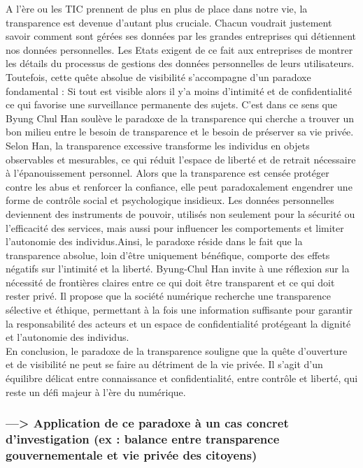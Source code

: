 \documentclass[11pt,a4paper]{article}
\begin{document}
A l’ère ou les TIC prennent de plus en plus de place dans notre vie, la transparence est devenue d’autant plus cruciale. Chacun voudrait justement savoir comment sont gérées ses données par les grandes entreprises qui détiennent nos données personnelles. Les Etats exigent de ce fait aux entreprises de montrer les détails du processus de gestions des données personnelles de leurs utilisateurs. Toutefois, cette quête absolue de visibilité s’accompagne d’un paradoxe fondamental : Si tout est visible alors il y’a moins d’intimité et de confidentialité ce qui favorise une surveillance permanente des sujets. C’est dans ce sens que Byung Chul Han soulève le paradoxe de la transparence qui cherche a trouver un bon milieu entre le besoin de transparence et le besoin de préserver sa vie privée. \\
Selon Han, la transparence excessive transforme les individus en objets observables et mesurables, ce qui réduit l’espace de liberté et de retrait nécessaire à l’épanouissement personnel. Alors que la transparence est censée protéger contre les abus et renforcer la confiance, elle peut paradoxalement engendrer une forme de contrôle social et psychologique insidieux. Les données personnelles deviennent des instruments de pouvoir, utilisés non seulement pour la sécurité ou l’efficacité des services, mais aussi pour influencer les comportements et limiter l’autonomie des individus.Ainsi, le paradoxe réside dans le fait que la transparence absolue, loin d’être uniquement bénéfique, comporte des effets négatifs sur l’intimité et la liberté. Byung-Chul Han invite à une réflexion sur la nécessité de frontières claires entre ce qui doit être transparent et ce qui doit rester privé. Il propose que la société numérique recherche une transparence sélective et éthique, permettant à la fois une information suffisante pour garantir la responsabilité des acteurs et un espace de confidentialité protégeant la dignité et l’autonomie des individus. \\

En conclusion, le paradoxe de la transparence souligne que la quête d’ouverture et de visibilité ne peut se faire au détriment de la vie privée. Il s’agit d’un équilibre délicat entre connaissance et confidentialité, entre contrôle et liberté, qui reste un défi majeur à l’ère du numérique.

\subsubsection{---> Application de ce paradoxe à un cas concret d’investigation (ex : balance entre transparence gouvernementale et vie privée des citoyens)}
\end{document}
